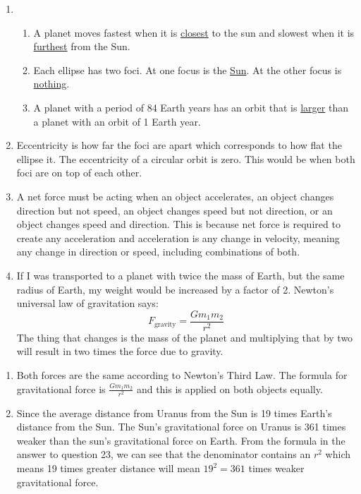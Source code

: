 \documentclass[../hw1.tex]{subfiles}
\begin{document}
    \begin{enumerate}
        \item \begin{enumerate}
            \item A planet moves fastest when it is \underline{closest} to the sun and slowest when it is \underline{furthest} from the Sun.
            \item Each ellipse has two foci. At one focus is the \underline{Sun}. At the other focus is \underline{nothing}.
            \item A planet with a period of 84 Earth years has an orbit that is \underline{larger} than a planet with an orbit of 1 Earth year.
        \end{enumerate}
        \item Eccentricity is how far the foci are apart which corresponds to how flat the ellipse it. The eccentricity of a circular orbit is zero. This would be when both foci are on top of each other.
        \item{} A net force must be acting when an object accelerates, an object changes direction but not speed, an object changes speed but not direction, or an object changes speed and direction. This is because net force is required to create any acceleration and acceleration is any change in velocity, meaning any change in direction or speed, including combinations of both.
        \item{} If I was transported to a planet with twice the mass of Earth, but the same radius of Earth, my weight would be increased by a factor of 2. Newton’s universal law of gravitation says: \[F_\mathrm{gravity} = \frac{G m_1 m_2}{r^2}\]The thing that changes is the mass of the planet and multiplying that by two will result in two times the force due to gravity.
    \end{enumerate}

    \begin{enumerate}
        \item{} Both forces are the same according to Newton’s Third Law. The formula for gravitational force is $\frac{G m_1 m_2}{r^2}$ and this is applied on both objects equally.
        \item Since the average distance from Uranus from the Sun is 19 times Earth’s distance from the Sun. The Sun’s gravitational force on Uranus is 361 times weaker than the sun’s gravitational force on Earth. From the formula in the answer to question 23, we can see that the denominator contains an $r^2$ which means 19 times greater distance will mean $19^2=361$ times weaker gravitational force.
    \end{enumerate}
\end{document}

